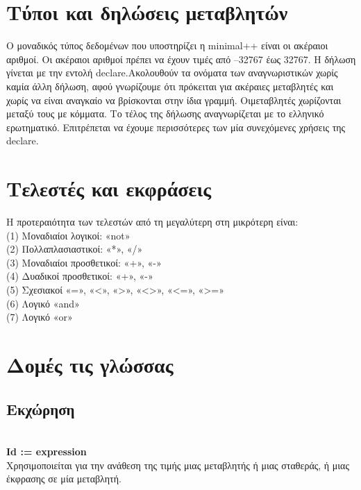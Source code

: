 \documentclass[12pt,a4paper,a4paper]{report}
\begin{document}
\section{Τύποι και δηλώσεις μεταβλητών}
Ο μοναδικός τύπος δεδομένων που υποστηρίζει η minimal++ είναι οι ακέραιοι αριθμοί. Οι     ακέραιοι αριθμοί πρέπει να έχουν τιμές από –32767 έως 32767. Η δήλωση γίνεται με την εντολή declare.Ακολουθούν τα ονόματα των αναγνωριστικών χωρίς καμία άλλη δήλωση, αφού γνωρίζουμε ότι πρόκειται για ακέραιες μεταβλητές και χωρίς να είναι αναγκαίο να βρίσκονται στην ίδια γραμμή. Οιμεταβλητές χωρίζονται μεταξύ τους με κόμματα. Το τέλος της δήλωσης αναγνωρίζεται με το ελληνικό ερωτηματικό. Επιτρέπεται να έχουμε περισσότερες των μία συνεχόμενες χρήσεις της declare.

\section{Τελεστές και εκφράσεις}
 Η προτεραιότητα των τελεστών από τη μεγαλύτερη στη μικρότερη είναι:\\
 (1) Μοναδιαίοι λογικοί: «not»\\
 (2) Πολλαπλασιαστικοί: «*», «/»\\
 (3) Μοναδιαίοι προσθετικοί: «+», «-»\\
 (4) Δυαδικοί προσθετικοί: «+», «-»\\
 (5) Σχεσιακοί «=», «<», «>», «<>», «<=», «>=»\\
 (6) Λογικό «and»\\
 (7) Λογικό «or»\\
 
 \section{Δομές τις γλώσσας}
 \subsection{Eκχώρηση}
\hspace{10mm}\\
\textbf{Id := expression }\\
 Χρησιμοποιείται για την ανάθεση της τιμής μιας μεταβλητής ή μιας σταθεράς, ή  μιας έκφρασης σε μία μεταβλητή.\\
 
 \newpage
 
\end{document}
